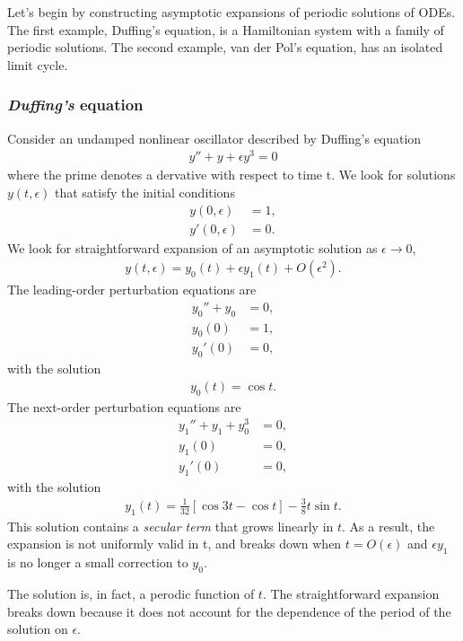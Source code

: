 Let's begin by constructing asymptotic expansions of periodic solutions of ODEs. The first example, Duffing's equation, is a Hamiltonian system with a family of periodic solutions. The second example, van der Pol's equation, has an isolated limit cycle. 

\subsubsection{\emph{Duffing's} equation}
Consider an undamped nonlinear oscillator described by Duffing's equation 
\begin{align}
	y''+y+ \epsilon y^3 = 0
\end{align}
where the prime denotes a dervative with respect to time t. We look for solutions $y(t,\epsilon)$ that satisfy the initial conditions
\begin{align}
	y(0,\epsilon) &= 1, \\
	y'(0,\epsilon) &= 0.
\end{align}
We look for straightforward expansion of an asymptotic solution as $\epsilon \rightarrow 0$, 
\begin{align}
	y(t,\epsilon) = y_0(t) + \epsilon y_1(t) + O(\epsilon^2).
\end{align}
The leading-order perturbation equations are
\begin{align}
	y_0''+y_0 &= 0, \\
	y_0(0) &= 1, \\
	y_0'(0) &= 0,
\end{align}
with the solution
\begin{align}
	y_0(t) = \cos{t}.
\end{align}
The next-order perturbation equations are
\begin{align}
	y_1''+y_1+y_0^3 &= 0, \\
	y_1(0) &= 0, \\
	y_1'(0) &= 0, 
\end{align}
with the solution
\begin{align}
	y_1(t) = \frac{1}{32} \left[\cos{3t} - \cos{t} \right] - \frac{3}{8} t \sin{t}.
\end{align}
This solution contains a \textit{secular term} that grows linearly in $t$. As a result, the expansion is not uniformly valid in t, and breaks down when $t = O(\epsilon)$ and $\epsilon y_1$ is no longer a small correction to $y_0$.

The solution is, in fact, a perodic function of $t$. The straightforward expansion breaks down because it does not account for the dependence of the period of the solution on $\epsilon$. 

